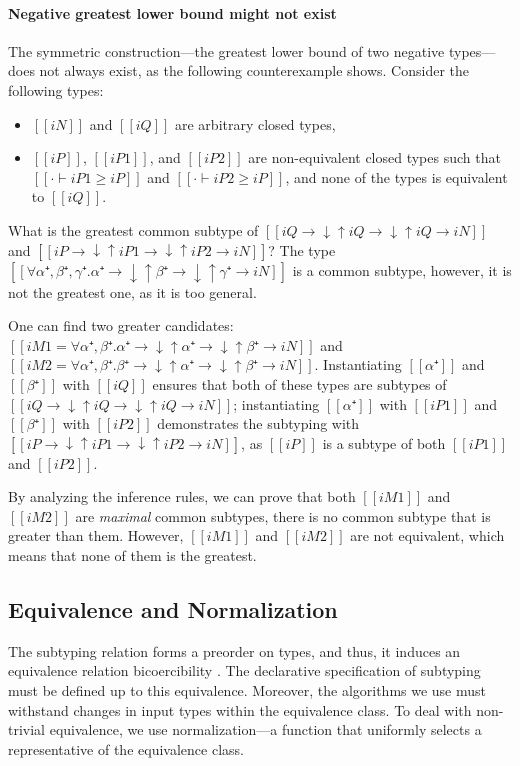 \paragraph{Negative greatest lower bound might not exist}
The symmetric construction---the greatest lower bound of two negative types---does 
not always exist, as the following counterexample shows.
Consider the following types: 
\begin{itemize}
  \item $[[iN]]$ and $[[iQ]]$ are arbitrary closed types, 
  \item $[[iP]]$, $[[iP1]]$, and $[[iP2]]$ are non-equivalent closed types 
    such that $[[· ⊢ iP1 ≥ iP]]$ and $[[· ⊢ iP2 ≥ iP]]$, and 
    none of the types is equivalent to $[[iQ]]$.
\end{itemize}
What is the greatest common subtype of  
$[[iQ → ↓↑iQ → ↓↑iQ → iN]]$ and $[[iP → ↓↑iP1 → ↓↑iP2 → iN]]$?
The type $[[∀α⁺,β⁺,γ⁺. α⁺ → ↓↑β⁺ → ↓↑γ⁺ → iN]]$ is a common subtype,
however, it is not the greatest one, as it is too general.

One can find two greater candidates:
$[[iM1 = ∀α⁺,β⁺. α⁺ → ↓↑α⁺ → ↓↑β⁺ → iN]]$ and $[[iM2 = ∀α⁺,β⁺. β⁺ → ↓↑α⁺ → ↓↑β⁺ → iN]]$.
Instantiating $[[α⁺]]$ and $[[β⁺]]$ with $[[iQ]]$ ensures 
that both of these types are subtypes of $[[iQ → ↓↑iQ → ↓↑iQ → iN]]$;
instantiating $[[α⁺]]$ with $[[iP1]]$ and $[[β⁺]]$ with $[[iP2]]$
demonstrates the subtyping with $[[iP → ↓↑iP1 → ↓↑iP2 → iN]]$,
as $[[iP]]$ is a subtype of both $[[iP1]]$ and $[[iP2]]$.

By analyzing the inference rules, we can prove that
both $[[iM1]]$ and $[[iM2]]$ are \emph{maximal} common 
subtypes, \ie there is no common subtype that is greater than them.
However, $[[iM1]]$ and $[[iM2]]$ are not equivalent,
which means that none of them is the greatest.

\subsection{Equivalence and Normalization}
\label{sec:decl-equivalence}

The subtyping relation forms a preorder on types,
and thus, it induces an equivalence relation \aka bicoercibility 
\cite{tiuryn1995:bicoercibility}.
The declarative specification of subtyping must be defined up to this equivalence.
Moreover, the algorithms we use must withstand changes in input types within the equivalence class.
To deal with non-trivial equivalence, 
we use normalization---a function that uniformly selects a representative of the equivalence class.

